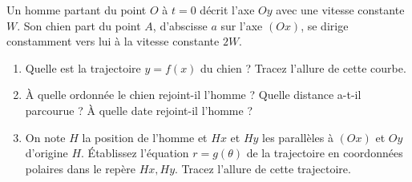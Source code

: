 %
\begin{exercice}
  Un homme partant du point \(O\) à \(t=0\) décrit l'axe \(Oy\) avec une vitesse constante \(W\). Son chien part du point \(A\), d'abscisse \(a\) sur l'axe \((Ox)\), se dirige constamment vers lui à la vitesse constante \(2W\).
  \begin{enumerate}
  \item Quelle est la trajectoire \(y=f(x)\) du chien ? Tracez l'allure de cette courbe.
  \item À quelle ordonnée le chien rejoint-il l'homme ? Quelle distance a-t-il parcourue ? À quelle date rejoint-il l'homme ?
  \item On note \(H\) la position de l'homme et \(Hx\) et \(Hy\) les parallèles à \((Ox)\) et \(Oy\) d'origine \(H\). Établissez l'équation \(r=g(\theta)\) de la trajectoire en coordonnées polaires dans le repère \(Hx,Hy\). Tracez l'allure de cette trajectoire.
  \end{enumerate}
\end{exercice}
